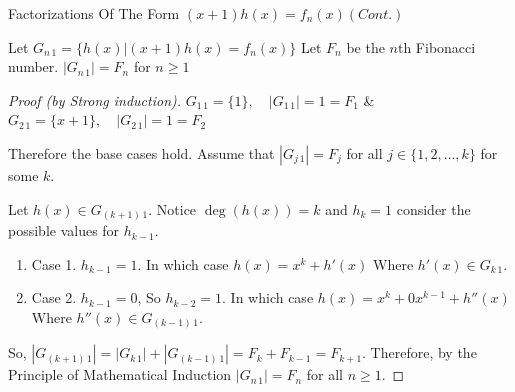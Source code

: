 \documentclass{beamer}
\begin{document}
    


    
    \begin{frame}[shrink=5]{Factorizations Of The Form $(x+1)h(x)= f_n(x) (Cont.)$}

        \begin{theorem}
            Let $ G_{n \, 1}= \{h(x)|(x+1) h(x) = f_n(x) \}$
            Let $F_n$ be the $n\text{th}$ Fibonacci number.
            $|G_{n \, 1}| = F_{n}$ for $n \geq 1$ 
        \end{theorem}
        \begin{proof}[Proof (by Strong induction)]    
            \noindent $G_{1 \, 1} = \{1\}, \quad |G_{1 \, 1}| = 1 = F_1$
            \enspace \& \enspace
            $G_{2 \, 1} = \{x+1\}, \quad |G_{2 \, 1}| = 1 = F_2$
            
            Therefore the base cases hold. Assume that $|G_{j\,1}| = F_{j}$ for all $j \in \{1, 2, \ldots, k\}$ for some $k$. 
        
            Let $h(x) \in G_{(k+1)\, 1}$. Notice $\deg(h(x))=k$ and $h_k=1$ consider the possible values for $h_{k-1}$.
                \begin{enumerate}
                    \item Case 1. $h_{k-1} = 1$. In which case $h(x)=x^k + h'(x)$ Where $h'(x) \in G_{k\, 1}$.
                    \item Case 2. $h_{k-1} = 0$, So $h_{k-2} = 1$. In which case $h(x)=x^k + 0x^{k-1}+ h''(x)$ Where $h''(x) \in G_{(k-1) \, 1}$. 
                \end{enumerate}
                So, $|G_{(k+1) \, 1}| = |G_{k \, 1}| + |G_{(k-1)\, 1}| = F_{k} + F_{k-1} = F_{k+1}$.
                Therefore, by the Principle of Mathematical Induction $|G_{n\,1}| = F_{n}$ for all $n\ge1$.
        \end{proof}
    \end{frame}
\end{document}
